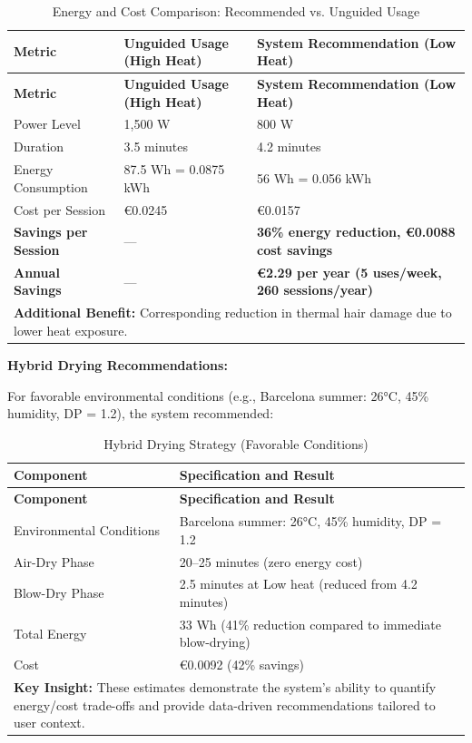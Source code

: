 \documentclass[11pt,a4paper]{article}
\begin{document}
\begin{longtable}{|p{}|p{}|p{}|}
\caption{Energy and Cost Comparison: Recommended vs. Unguided Usage}
\label{tab:energy_comparison} \\
\hline
\textbf{Metric} & \textbf{Unguided Usage (High Heat)} & \textbf{System Recommendation (Low Heat)} \\
\hline
\endfirsthead
\hline
\textbf{Metric} & \textbf{Unguided Usage (High Heat)} & \textbf{System Recommendation (Low Heat)} \\
\hline
\endhead
\hline
\endfoot
\hline
\endlastfoot
Power Level & 1,500 W & 800 W \\
\hline
Duration & 3.5 minutes & 4.2 minutes \\
\hline
Energy Consumption & 87.5 Wh = 0.0875 kWh & 56 Wh = 0.056 kWh \\
\hline
Cost per Session & €0.0245 & €0.0157 \\
\hline
\textbf{Savings per Session} & --- & \textbf{36\% energy reduction, €0.0088 cost savings} \\
\hline
\textbf{Annual Savings} & --- & \textbf{€2.29 per year (5 uses/week, 260 sessions/year)} \\
\hline
\multicolumn{3}{|p{0.94\textwidth}|}{\textbf{Additional Benefit:} Corresponding reduction in thermal hair damage due to lower heat exposure.} \\
\hline
\end{longtable}

\vspace{0.5em}
\noindent\textbf{Hybrid Drying Recommendations:}

\noindent For favorable environmental conditions (e.g., Barcelona summer: 26°C, 45\% humidity, DP = 1.2), the system recommended:

\begin{longtable}{|p{}|p{}|}
\caption{Hybrid Drying Strategy (Favorable Conditions)}
\label{tab:hybrid_drying} \\
\hline
\textbf{Component} & \textbf{Specification and Result} \\
\hline
\endfirsthead
\hline
\textbf{Component} & \textbf{Specification and Result} \\
\hline
\endhead
\hline
\endfoot
\hline
\endlastfoot
Environmental Conditions & Barcelona summer: 26°C, 45\% humidity, DP = 1.2 \\
\hline
Air-Dry Phase & 20--25 minutes (zero energy cost) \\
\hline
Blow-Dry Phase & 2.5 minutes at Low heat (reduced from 4.2 minutes) \\
\hline
Total Energy & 33 Wh (41\% reduction compared to immediate blow-drying) \\
\hline
Cost & €0.0092 (42\% savings) \\
\hline
\multicolumn{2}{|p{0.94\textwidth}|}{\textbf{Key Insight:} These estimates demonstrate the system's ability to quantify energy/cost trade-offs and provide data-driven recommendations tailored to user context.} \\
\hline
\end{longtable}
\end{document}
